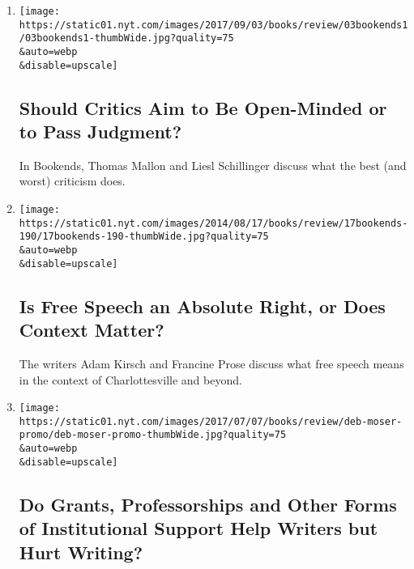 \begin{enumerate}
\def\labelenumi{\arabic{enumi}.}
\item
  \href{/2017/08/29/books/review/criticism-objectivity-judgement.html}{}

  \texttt{[image: https://static01.nyt.com/images/2017/09/03/books/review/03bookends1/03bookends1-thumbWide.jpg?quality=75\\\&auto=webp\\\&disable=upscale]}

  \hypertarget{should-critics-aim-to-be-open-minded-or-to-pass-judgment}{%
  \subsection{Should Critics Aim to Be Open-Minded or to Pass
  Judgment?}\label{should-critics-aim-to-be-open-minded-or-to-pass-judgment}}

  In Bookends, Thomas Mallon and Liesl Schillinger discuss what the best
  (and worst) criticism does.
\item
  \href{/2017/08/24/books/review/free-speech-hate-charlottesville.html}{}

  \texttt{[image: https://static01.nyt.com/images/2014/08/17/books/review/17bookends-190/17bookends-190-thumbWide.jpg?quality=75\\\&auto=webp\\\&disable=upscale]}

  \hypertarget{is-free-speech-an-absolute-right-or-does-context-matter}{%
  \subsection{Is Free Speech an Absolute Right, or Does Context
  Matter?}\label{is-free-speech-an-absolute-right-or-does-context-matter}}

  The writers Adam Kirsch and Francine Prose discuss what free speech
  means in the context of Charlottesville and beyond.
\item
  \href{/2017/07/07/books/review/do-grants-professorships-and-other-forms-of-institutional-support-help-writers-but-hurt-writing.html}{}

  \texttt{[image: https://static01.nyt.com/images/2017/07/07/books/review/deb-moser-promo/deb-moser-promo-thumbWide.jpg?quality=75\\\&auto=webp\\\&disable=upscale]}

  \hypertarget{do-grants-professorships-and-other-forms-of-institutional-support-help-writers-but-hurt-writing}{%
  \subsection{Do Grants, Professorships and Other Forms of Institutional
  Support Help Writers but Hurt
  Writing?}\label{do-grants-professorships-and-other-forms-of-institutional-support-help-writers-but-hurt-writing}}


\end{enumerate}
